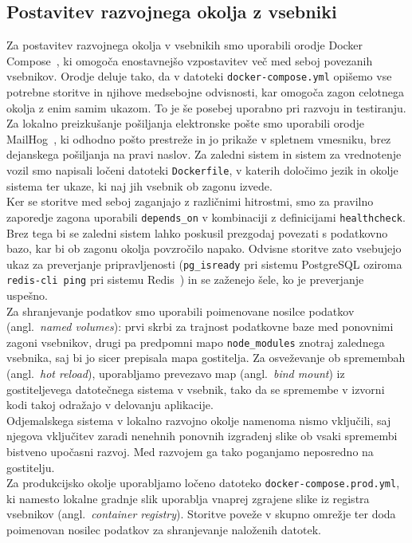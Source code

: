 \documentclass[a4paper,12pt,openright]{book}
\begin{document}
\subsection{Postavitev razvojnega okolja z vsebniki}
Za postavitev razvojnega okolja v vsebnikih smo uporabili orodje Docker Compose~\cite{docker-compose-docs}, ki
omogoča enostavnejšo vzpostavitev več med seboj povezanih vsebnikov. Orodje deluje tako, da v datoteki
\texttt{docker-compose.yml} opišemo vse potrebne storitve
in njihove medsebojne odvisnosti, kar omogoča zagon celotnega okolja z enim
samim ukazom. To je še posebej uporabno pri razvoju in testiranju. Za lokalno
preizkušanje pošiljanja elektronske pošte smo uporabili orodje MailHog~\cite{mailhog}, ki
odhodno pošto prestreže in jo prikaže v spletnem vmesniku, brez
dejanskega pošiljanja na pravi naslov. Za zaledni sistem in sistem za vrednotenje vozil smo napisali
ločeni datoteki \texttt{Dockerfile}, v katerih določimo jezik in okolje sistema ter ukaze, ki naj jih vsebnik ob zagonu izvede.\\
Ker se storitve med seboj zaganjajo z različnimi hitrostmi, smo za pravilno
zaporedje zagona uporabili \texttt{depends\_on} v kombinaciji z
definicijami \texttt{healthcheck}. Brez tega bi se zaledni sistem lahko poskusil prezgodaj
povezati s podatkovno bazo, kar bi
ob zagonu okolja povzročilo napako. Odvisne storitve zato vsebujejo ukaz za preverjanje pripravljenosti (\texttt{pg\_isready}
pri sistemu PostgreSQL oziroma \texttt{redis-cli ping} pri sistemu Redis~\cite{redis-data-store})
 in se zaženejo šele, ko je preverjanje uspešno.\\
Za shranjevanje podatkov smo uporabili poimenovane nosilce podatkov (angl.\
\emph{named volumes}): prvi skrbi za trajnost podatkovne baze med ponovnimi
zagoni vsebnikov, drugi pa predpomni mapo \texttt{node\_modules} znotraj
zalednega vsebnika, saj bi jo sicer prepisala mapa gostitelja. Za
osveževanje ob spremembah
(angl.\ \emph{hot reload}), uporabljamo prevezavo map (angl.\ \emph{bind mount})
iz gostiteljevega datotečnega sistema v vsebnik, tako da se spremembe v izvorni
kodi takoj odražajo v delovanju aplikacije.\\
Odjemalskega sistema v lokalno razvojno okolje namenoma nismo vključili, saj
njegova vključitev zaradi nenehnih ponovnih izgradenj slike ob vsaki spremembi
bistveno upočasni razvoj. Med razvojem ga tako poganjamo neposredno na
gostitelju.\\
Za produkcijsko okolje uporabljamo ločeno datoteko
\texttt{docker-compose.prod\allowbreak.yml}, ki namesto lokalne gradnje slik uporablja
vnaprej zgrajene slike iz registra vsebnikov (angl.\ \emph{container registry}).
Storitve poveže v skupno omrežje ter doda poimenovan nosilec podatkov za
shranjevanje naloženih datotek.
\end{document}

